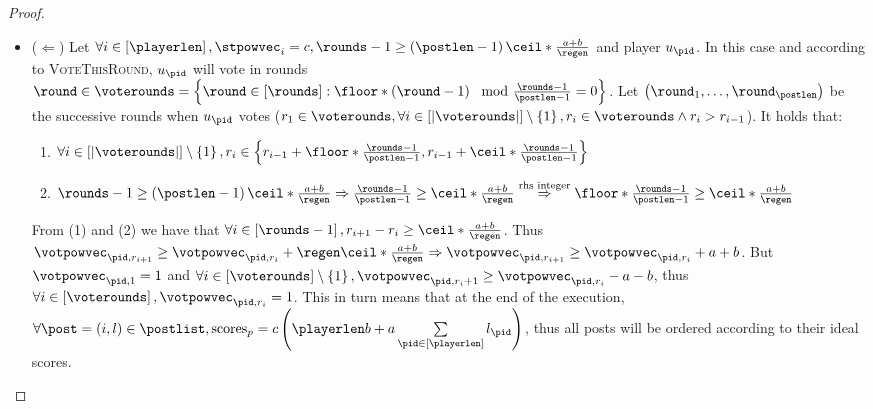 \begin{proof}
  \begin{itemize}
    \item ($\Leftarrow$) Let $\forall i \in \left[\playerlen\right], \stpowvec_i
    = c, \rounds - 1 \geq \left(\postlen - 1\right)\ceil*{\frac{a+b}{\regen}}$
    and player $u_{\pid}$. In this case and according to \textsc{VoteThisRound},
    $u_{\pid}$ will vote in rounds $\round \in \voterounds = \left\{\round \in
    \left[\rounds\right] : \floor*{\left(\round - 1\right) \mod \frac{\rounds -
    1}{\postlen - 1}} = 0\right\}$. Let $\left(\round_1, \dots,
    \round_\postlen\right)$ be the successive rounds when $u_{\pid}$ votes ($r_1
    \in \voterounds, \forall i \in \left[|\voterounds|\right] \setminus
    \left\{1\right\}, r_i \in \voterounds \wedge r_i > r_{i - 1}$). It holds
    that:
    \begin{enumerate}
      \item $\forall i \in \left[|\voterounds|\right] \setminus
      \left\{1\right\}, r_i \in \left\{r_{i - 1} + \floor*{\frac{\rounds -
      1}{\postlen - 1}}, r_{i - 1} + \ceil*{\frac{\rounds - 1}{\postlen -
      1}}\right\}$

      \item $\rounds - 1 \geq \left(\postlen -
      1\right)\ceil*{\frac{a+b}{\regen}} \Rightarrow \frac{\rounds - 1}{\postlen
      - 1} \geq \ceil*{\frac{a+b}{\regen}} \overset{\text{rhs
      integer}}{\Rightarrow} \floor*{\frac{\rounds - 1}{\postlen - 1}} \geq
      \ceil*{\frac{a+b}{\regen}}$
    \end{enumerate}
    From (1) and (2) we have that $\forall i \in \left[\rounds - 1\right],
    r_{i+1} - r_i \geq \ceil*{\frac{a+b}{\regen}}$. Thus $\votpowvec_{\pid, r_{i
    + 1}} \geq \votpowvec_{\pid, r_i} + \regen\ceil*{\frac{a+b}{\regen}}
    \Rightarrow \votpowvec_{\pid, r_{i + 1}} \geq \votpowvec_{\pid, r_i} + a +
    b$. But $\votpowvec_{\pid, 1} = 1$ and $\forall i \in
    \left[\voterounds\right] \setminus \left\{1\right\}, \votpowvec_{\pid, r_i
    + 1} \geq \votpowvec_{\pid, r_i} - a - b$, thus $\forall i \in
    \left[\voterounds\right], \votpowvec_{\pid, r_i} = 1$. This in turn means
    that at the end of the execution, $\forall \post = \left(i, l\right) \in \postlist,
    \mathrm{scores}_{p} = c\left(\playerlen b + a \sum\limits_{\pid \in
    \left[\playerlen\right]} l_{\pid}\right)$, thus all posts will be ordered
    according to their ideal scores.


\end{itemize}
\end{proof}
